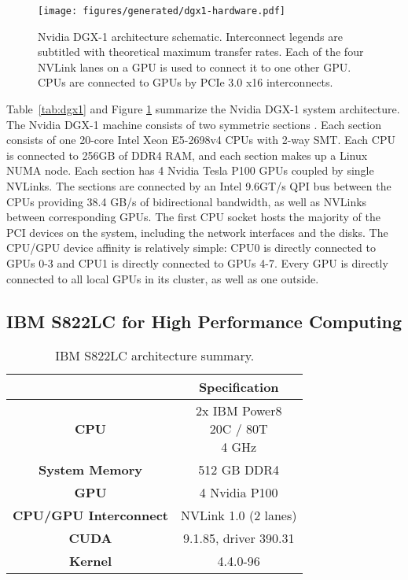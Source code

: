 \begin{figure}[ht]
    \centering
	\texttt{[image: figures/generated/dgx1-hardware.pdf]}
    \caption[Nvidia DGX-1 architecture schematic]{
		Nvidia DGX-1 architecture schematic.
		Interconnect legends are subtitled with theoretical maximum transfer rates.
		Each of the four NVLink lanes on a GPU is used to connect it to one other GPU.
		CPUs are connected to GPUs by PCIe 3.0 x16 interconnects.
	}
    \label{fig:topo-dgx-simple}
\end{figure}

Table~\ref{tab:dgx1} and Figure \ref{fig:topo-dgx-simple} summarize the Nvidia DGX-1 system architecture.
The Nvidia DGX-1 machine consists of two symmetric sections \cite{nvidia2017dgx1}.
Each section consists of one 20-core Intel Xeon E5-2698v4 CPUs with 2-way SMT.
Each CPU is connected to 256GB of DDR4 RAM, and each section makes up a Linux NUMA node.
Each section has 4 Nvidia Tesla P100 GPUs coupled by single NVLinks.
The sections are connected by an Intel 9.6GT/s QPI bus between the CPUs providing 38.4 GB/s of bidirectional bandwidth, as well as NVLinks between corresponding GPUs.
The first CPU socket hosts the majority of the PCI devices on the system, including the network interfaces and the disks.
The CPU/GPU device affinity is relatively simple: CPU0 is directly connected to GPUs 0-3 and CPU1 is directly connected to GPUs 4-7.
Every GPU is directly connected to all local GPUs in its cluster, as well as one outside.

\subsection{IBM S822LC for High Performance Computing}
\label{sec:s822lc}

\begin{table}[ht]
    \centering
    \caption[IBM S822LC architecture summary]{IBM S822LC architecture summary.}
    \label{tab:minsky}
    \begin{tabular}{cc}
    \hline
    \textbf{}                     & \textbf{Specification}                         \\ \hline
    \textbf{CPU}                  & \makecell{2x IBM Power8 \\ 20C / 80T \\ 4 GHz} \\ \hline
    \textbf{System Memory}        & 512 GB DDR4                                    \\ \hline
	\textbf{GPU}                  & 4 Nvidia P100                                  \\ \hline
	\textbf{CPU/GPU Interconnect} & NVLink 1.0 (2 lanes)                           \\ \hline
	\textbf{CUDA}                 & 9.1.85, driver 390.31                          \\ \hline
	\textbf{Kernel}               & 4.4.0-96                                       \\ \hline
    \end{tabular}
\end{table}

